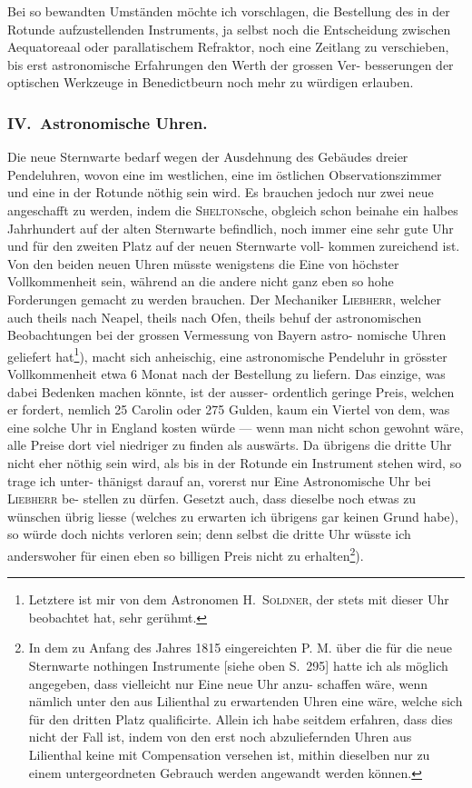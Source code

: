 \documentclass[12pt,a4paper]{article}
\theoremstyle{plain}
\theoremstyle{definition}
\theoremstyle{remark}
\begin{document}
Bei so bewandten Umst\"{a}nden m\"{o}chte ich vorschlagen, die Bestellung des
in der Rotunde aufzustellenden Instruments, ja selbst noch die Entscheidung
zwischen Aequatoreaal oder parallatischem Refraktor, noch eine Zeitlang zu
verschieben, bis erst astronomische Erfahrungen den Werth der grossen Ver-
besserungen der optischen Werkzeuge in Benedictbeurn noch mehr zu w\"{u}rdigen
erlauben.

\subsubsection*{IV.\ Astronomische Uhren.}

Die neue Sternwarte bedarf wegen der Ausdehnung des Geb\"{a}udes dreier
Pendeluhren, wovon eine im westlichen, eine im \"{o}stlichen Observationszimmer
und eine in der Rotunde n\"{o}thig sein wird. Es brauchen jedoch nur zwei
neue angeschafft zu werden, indem die \textsc{Shelton}sche, obgleich schon beinahe
ein halbes Jahrhundert auf der alten Sternwarte befindlich, noch immer eine
sehr gute Uhr und f\"{u}r den zweiten Platz auf der neuen Sternwarte voll-
kommen zureichend ist. Von den beiden neuen Uhren m\"{u}sste wenigstens die
Eine von h\"{o}chster Vollkommenheit sein, w\"{a}hrend an die andere nicht ganz
eben so hohe Forderungen gemacht zu werden brauchen. Der Mechaniker
\textsc{Liebherr}, welcher auch theils nach Neapel, theils nach Ofen, theils behuf der
astronomischen Beobachtungen bei der grossen Vermessung von Bayern astro-
nomische Uhren geliefert hat\footnote{Letztere ist mir von dem Astronomen H.\ \textsc{Soldner}, der stets mit dieser Uhr beobachtet hat, sehr
ger\"{u}hmt.}), macht sich anheischig, eine astronomische
Pendeluhr in gr\"{o}sster Vollkommenheit etwa 6 Monat nach der Bestellung
zu liefern. Das einzige, was dabei Bedenken machen k\"{o}nnte, ist der ausser-
ordentlich geringe Preis, welchen er fordert, nemlich 25 Carolin oder 275
Gulden, kaum ein Viertel von dem, was eine solche Uhr in England kosten
w\"{u}rde --- wenn man nicht schon gewohnt w\"{a}re, alle Preise dort viel niedriger
zu finden als ausw\"{a}rts. Da \"{u}brigens die dritte Uhr nicht eher n\"{o}thig sein
wird, als bis in der Rotunde ein Instrument stehen wird, so trage ich unter-
th\"{a}nigst darauf an, vorerst nur Eine Astronomische Uhr bei \textsc{Liebherr} be-
stellen zu d\"{u}rfen. Gesetzt auch, dass dieselbe noch etwas zu w\"{u}nschen \"{u}brig
liesse (welches zu erwarten ich \"{u}brigens gar keinen Grund habe), so w\"{u}rde
doch nichts verloren sein; denn selbst die dritte Uhr w\"{u}sste ich anderswoher
f\"{u}r einen eben so billigen Preis nicht zu erhalten\footnote{In dem zu Anfang des Jahres 1815 eingereichten P. M. \"{u}ber die f\"{u}r die neue Sternwarte nothingen
Instrumente [siehe oben S.\ 295] hatte ich als m\"{o}glich angegeben, dass vielleicht nur Eine neue Uhr anzu-
schaffen w\"{a}re, wenn n\"{a}mlich unter den aus Lilienthal zu erwartenden Uhren eine w\"{a}re, welche sich f\"{u}r
den dritten Platz qualificirte. Allein ich habe seitdem erfahren, dass dies nicht der Fall ist, indem von
den erst noch abzuliefernden Uhren aus Lilienthal keine mit Compensation versehen ist, mithin dieselben
nur zu einem untergeordneten Gebrauch werden angewandt werden k\"{o}nnen.}).
\end{document}
